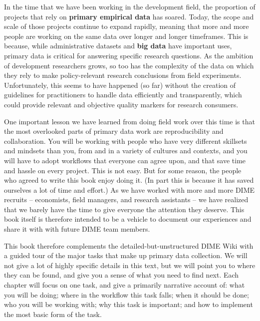 In the time that we have been working in the development field,
the proportion of projects that rely on \textbf{primary empirical data} has soared.\cite{angrist2017economic}
Today, the scope and scale of those projects continue to expand rapidly,
meaning that more and more people are working on the same data over longer and longer timeframes.
This is because, while administrative datasets
and \textbf{big data} have important uses,
primary data 
is critical for answering specific research questions.\cite{levitt2009field}
As the ambition of development researchers grows, so too has the complexity of the data
on which they rely to make policy-relevant research conclusions from field experiments.
Unfortunately, this seems to have happened (so far) without the creation of 
guidelines for practitioners to handle data efficiently and transparently,
which could provide relevant and objective quality markers for research consumers.

One important lesson we have learned from doing field work over this time is that
the most overlooked parts of primary data work are reproducibility and collaboration.
You will be working with people 
who have very different skillsets and mindsets than you,
from and in a variety of cultures and contexts, and you will have to adopt workflows
that everyone can agree upon, and that save time and hassle on every project.
This is not easy. But for some reason, the people who agreed to write this book enjoy doing it.
(In part this is because it has saved ourselves a lot of time and effort.)
As 
we have worked with more and more DIME recruits
-- economists, field managers, and research assistants --
we have realized that we barely have the time to give everyone the attention they deserve.
This book itself is therefore intended to be a vehicle to document our experiences and share it with with future DIME team members.

This book therefore complements the detailed-but-unstructured DIME Wiki
with a guided tour of the major tasks that make up primary data collection.
We will not give a lot of highly specific details in this text,
but we will point you to where they can be found,
and give you a sense of what you need to find next.
Each chapter will focus on one task,
and give a primarily narrative account of:
what you will be doing; where in the workflow this task falls;
when it should be done; who you will be working with;
why this task is important; and how to implement the most basic form of the task.


